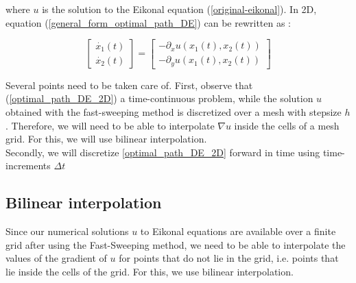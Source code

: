 \documentclass[11pt]{article}
\theoremstyle{definition}
\theoremstyle{remark}
\begin{document}
\noindent where $u$ is the solution to the Eikonal equation (\ref{original-eikonal}). In 2D, equation (\ref{general_form_optimal_path_DE}) can be rewritten as : 

\begin{equation}
\label{optimal_path_DE_2D}
    \begin{bmatrix}
        \dot{x_1}(t) \\
        \dot{x_2}(t)
    \end{bmatrix} = \begin{bmatrix}
        -\partial_xu(x_1(t),x_2(t)) \\
        -\partial_yu(x_1(t),x_2(t))
    \end{bmatrix}
\end{equation}

\noindent Several points need to be taken care of. First, observe that (\ref{optimal_path_DE_2D}) a time-continuous problem, while the solution $u$ obtained with the fast-sweeping method is discretized over a mesh with stepsize $h$. Therefore, we will need to be able to interpolate $\nabla u$ inside the cells of a mesh grid. For this, we will use bilinear interpolation.
\\
Secondly, we will discretize \ref{optimal_path_DE_2D} forward in time using time-increments $\Delta t$ 

\subsection{Bilinear interpolation}
Since our numerical solutions $u$ to Eikonal equations are available over a finite grid after using the Fast-Sweeping method, we need to be able to interpolate the values of the gradient of $u$ for points that do not lie in the grid, i.e. points that lie inside the cells of the grid. For this, we use bilinear interpolation.


\end{document}
